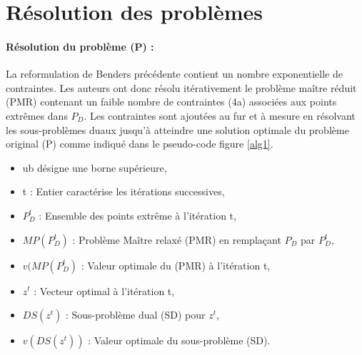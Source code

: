 \section{Résolution des problèmes}

\paragraph{Résolution du problème (P) :}La reformulation de Benders précédente contient un nombre exponentielle de contraintes. Les auteurs ont donc résolu itérativement le problème maître réduit (PMR) contenant un faible nombre de contraintes (4a) associées aux points extrêmes dans $P_D$. Les contraintes sont ajoutées au fur et à mesure en résolvant les sous-problèmes duaux jusqu'à atteindre une solution optimale du problème original (P) comme indiqué dans le pseudo-code  figure \ref{alg1}.

\begin{itemize}
	\item ub désigne une borne supérieure,
	\item t : Entier caractérise les itérations successives,
	\item $P^t_D$ : Ensemble des points extrême à l'itération t, 
	\item  $MP(P^t_D)$ : Problème Maître relaxé (PMR) en remplaçant $P_D$ par $P^t_D$,
	\item $v(MP(P^t_D)$ : Valeur optimale du (PMR) à l'itération t,
	\item $z^t$ : Vecteur optimal à l'itération t,
	\item $DS(z^t)$ : Sous-problème dual (SD) pour $z^t$,
	\item $v(DS(z^t))$ : Valeur optimale du sous-problème (SD).
\end{itemize}


